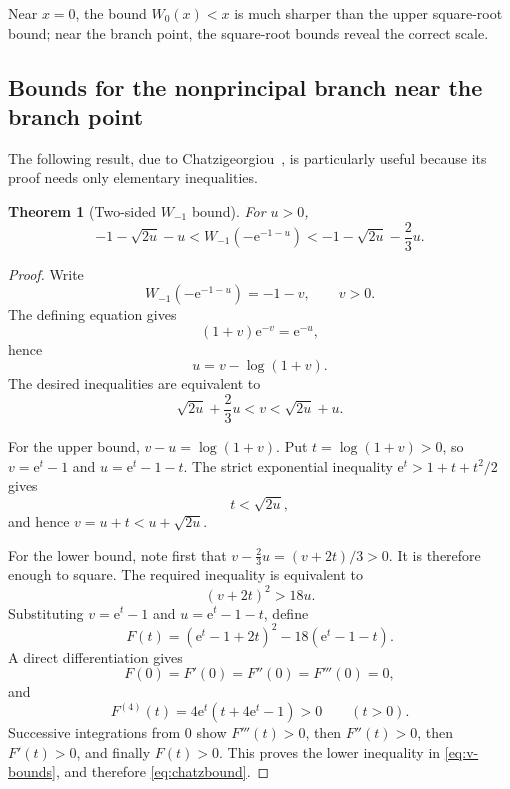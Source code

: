 \documentclass[11pt]{article}
\newtheorem{theorem}{Theorem}[section]
\theoremstyle{remark}
\newcommand{\Wm}{W_{-1}}
\newcommand{\ee}{\mathrm e}
\begin{document}
Near \(x=0\), the bound \(W_0(x)<x\) is much sharper than the upper
square-root bound; near the branch point, the square-root bounds reveal the
correct scale.

\subsection{Bounds for the nonprincipal branch near the branch point}

The following result, due to Chatzigeorgiou~\cite{chatzigeorgiou2013}, is
particularly useful because its proof needs only elementary inequalities.

\begin{theorem}[Two-sided \(W_{-1}\) bound]\label{thm:chatzbound}
For \(u>0\),
\begin{equation}\label{eq:chatzbound}
 \boxed{\displaystyle
 -1-\sqrt{2u}-u
 <\Wm(-\ee^{-1-u})
 <-1-\sqrt{2u}-\frac23u.}
\end{equation}
\end{theorem}

\begin{proof}
Write
\[
       \Wm(-\ee^{-1-u})=-1-v,\qquad v>0.
\]
The defining equation gives
\[
       (1+v)\ee^{-v}=\ee^{-u},
\]
hence
\begin{equation}\label{eq:u-v}
       u=v-\log(1+v).
\end{equation}
The desired inequalities are equivalent to
\begin{equation}\label{eq:v-bounds}
       \sqrt{2u}+\frac23u<v<\sqrt{2u}+u.
\end{equation}

For the upper bound, \(v-u=\log(1+v)\).  Put
\(t=\log(1+v)>0\), so \(v=\ee^t-1\) and
\(u=\ee^t-1-t\).  The strict exponential inequality
\(\ee^t>1+t+t^2/2\) gives
\[
       t<\sqrt{2u},
\]
and hence \(v=u+t<u+\sqrt{2u}\).

For the lower bound, note first that \(v-\frac23u=(v+2t)/3>0\).
It is therefore enough to square.  The required inequality is equivalent to
\[
       (v+2t)^2>18u.
\]
Substituting \(v=\ee^t-1\) and \(u=\ee^t-1-t\), define
\[
 F(t)=(\ee^t-1+2t)^2-18(\ee^t-1-t).
\]
A direct differentiation gives
\[
 F(0)=F'(0)=F''(0)=F'''(0)=0,
\]
and
\[
       F^{(4)}(t)=4\ee^t(t+4\ee^t-1)>0\qquad(t>0).
\]
Successive integrations from \(0\) show
\(F'''(t)>0\), then \(F''(t)>0\), then \(F'(t)>0\), and finally
\(F(t)>0\).  This proves the lower inequality in
\eqref{eq:v-bounds}, and therefore \eqref{eq:chatzbound}.
\end{proof}
\end{document}
